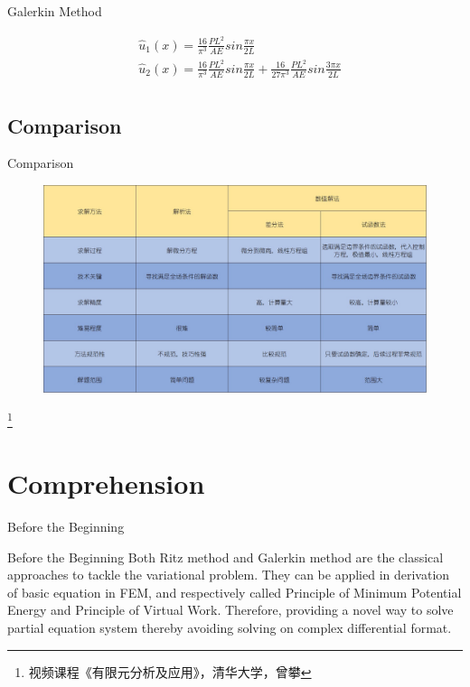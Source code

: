 \documentclass[11pt]{beamer}
\begin{document}
\begin{frame}{Galerkin Method}
\begin{example}
\begin{align*}
&\hat{u}_1(x)= \frac{16}{\pi^3}\frac{PL^2}{AE}sin\frac{\pi x}{2L}\\
&\hat{u}_2(x)= \frac{16}{\pi^3}\frac{PL^2}{AE}sin\frac{\pi x}{2L}+\frac{16}{27\pi^3}\frac{PL^2}{AE}sin\frac{3\pi x}{2L}\\
\end{align*}
\end{example}
\end{frame}

\subsection{Comparison}
\begin{frame}{Comparison}
\begin{figure}
\includegraphics[width=1\linewidth]{source/bijiao}
\end{figure}\footnote{视频课程《有限元分析及应用》，清华大学，曾攀}
\end{frame}

\section{Comprehension}
\begin{frame}{Before the Beginning}
\begin{block}{Before the Beginning}
Both Ritz method and Galerkin method are the classical approaches to tackle the variational problem. They can be applied in derivation of basic equation in FEM, and respectively called Principle of Minimum Potential Energy and Principle of Virtual Work. Therefore, providing a novel way to solve partial equation system thereby avoiding solving on complex differential format.
\end{block}
\end{frame}
\end{document}
